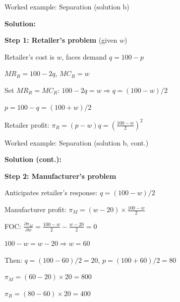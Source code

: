 \documentclass[notes,11pt, aspectratio=169]{beamer}
\newenvironment{wideitemize}{\itemize\addtolength{\itemsep}{10pt}}{\enditemize}
\begin{document}
\begin{frame}{Worked example: Separation (solution b)}
	\begin{wideitemize}
		\item \textbf{Solution:}
		\item \textbf{Step 1: Retailer's problem} (given $w$)
		\item Retailer's cost is $w$, faces demand $q = 100 - p$
		\item $MR_R = 100 - 2q$, $MC_R = w$
		\item Set $MR_R = MC_R$: $100 - 2q = w \Rightarrow q = (100 - w)/2$
		\item $p = 100 - q = (100 + w)/2$
		\item Retailer profit: $\pi_R = (p - w)q = \left(\frac{100 - w}{2}\right)^2$
	\end{wideitemize}
\end{frame}

\begin{frame}{Worked example: Separation (solution b, cont.)}
	\begin{wideitemize}
		\item \textbf{Solution (cont.):}
		\item \textbf{Step 2: Manufacturer's problem}
		\item Anticipates retailer's response: $q = (100 - w)/2$
		\item Manufacturer profit: $\pi_M = (w - 20) \times \frac{100 - w}{2}$
		\item FOC: $\frac{\partial \pi_M}{\partial w} = \frac{100 - w}{2} - \frac{w - 20}{2} = 0$
		\item $100 - w = w - 20 \Rightarrow w = 60$
		\item Then: $q = (100 - 60)/2 = 20$, $p = (100 + 60)/2 = 80$
		\item $\pi_M = (60 - 20) \times 20 = 800$
		\item $\pi_R = (80 - 60) \times 20 = 400$
	\end{wideitemize}
\end{frame}
\end{document}
